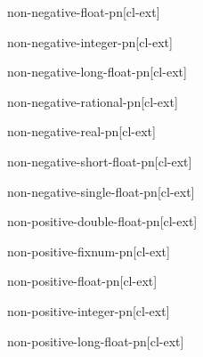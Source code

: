 \documentclass[10pt,english]{book}
\begin{document}
\begin{function}{non-negative-float-p}{n}[cl-ext]
  
\end{function}

\begin{function}{non-negative-integer-p}{n}[cl-ext]
  
\end{function}

\begin{function}{non-negative-long-float-p}{n}[cl-ext]
  
\end{function}

\begin{function}{non-negative-rational-p}{n}[cl-ext]
  
\end{function}

\begin{function}{non-negative-real-p}{n}[cl-ext]
  
\end{function}

\begin{function}{non-negative-short-float-p}{n}[cl-ext]
  
\end{function}

\begin{function}{non-negative-single-float-p}{n}[cl-ext]
  
\end{function}

\begin{function}{non-positive-double-float-p}{n}[cl-ext]
  
\end{function}

\begin{function}{non-positive-fixnum-p}{n}[cl-ext]
  
\end{function}

\begin{function}{non-positive-float-p}{n}[cl-ext]
  
\end{function}

\begin{function}{non-positive-integer-p}{n}[cl-ext]
  
\end{function}

\begin{function}{non-positive-long-float-p}{n}[cl-ext]
  
\end{function}
\end{document}

